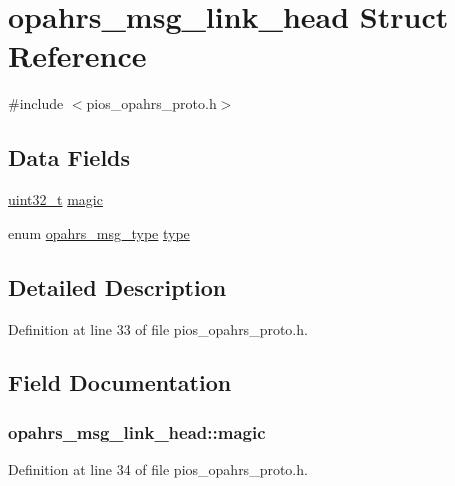 \hypertarget{structopahrs__msg__link__head}{\section{opahrs\-\_\-msg\-\_\-link\-\_\-head Struct Reference}
\label{structopahrs__msg__link__head}
}


{\ttfamily \#include $<$pios\-\_\-opahrs\-\_\-proto.\-h$>$}

\subsection*{Data Fields}
\begin{DoxyCompactItemize}
\item 
\hyperlink{stdint_8h_a435d1572bf3f880d55459d9805097f62}{uint32\-\_\-t} \hyperlink{structopahrs__msg__link__head_ab86bee660a37701069efb0315e47e3bb}{magic}
\item 
enum \hyperlink{group___p_i_o_s___o_p_a_h_r_s_ga6092fca5dcee8d4bb3dd441183beaa96}{opahrs\-\_\-msg\-\_\-type} \hyperlink{structopahrs__msg__link__head_a2ef0c8a3460a335147b3092e1897be73}{type}
\end{DoxyCompactItemize}


\subsection{Detailed Description}


Definition at line 33 of file pios\-\_\-opahrs\-\_\-proto.\-h.



\subsection{Field Documentation}
\hypertarget{structopahrs__msg__link__head_ab86bee660a37701069efb0315e47e3bb}{
\subsubsection[{magic}]{ opahrs\-\_\-msg\-\_\-link\-\_\-head\-::magic}}\label{structopahrs__msg__link__head_ab86bee660a37701069efb0315e47e3bb}


Definition at line 34 of file pios\-\_\-opahrs\-\_\-proto.\-h.

